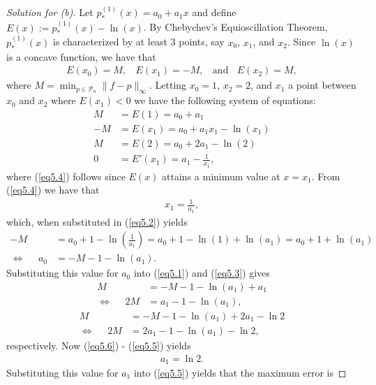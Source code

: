 \documentclass[8pt]{article}
\theoremstyle{definition}
\begin{document}
\begin{proof}[Solution for (b)]
Let $p_*^{(1)} (x) = a_0 + a_1 x$ and define $E(x) := p_*^{(1)} (x) - \ln(x)$. By Chebychev's Equioscillation Theorem, $p_*^{(1)}(x)$ is characterized by at least 3 points, say $x_0$, $x_1$, and $x_2$. Since $\ln(x)$ is a concave function, we have that 
\begin{align*}
E(x_0) = M, \ \ \ \ E(x_1) = -M, \ \ \ \ \text{and} \ \ \ \ E(x_2) = M,
\end{align*}
where $M = \min_{p \in\mathcal{P}_n} \| f - p \|_{\infty}$. Letting $x_0 = 1$, $x_2 = 2$, and $x_1$ a point between $x_0$ and $x_2$ where $E(x_1) < 0$ we have the following system of equations:
\begin{align}
M &= E(1) = a_0 + a_1 \label{eq5.1} \\
-M &= E(x_1) = a_0 + a_1 x_1 - \ln(x_1) \label{eq5.2} \\
M &= E(2) = a_0 + 2 a_1 - \ln(2) \label{eq5.3} \\
0 &= E'(x_1) = a_1 - \frac{1}{x_1}, \label{eq5.4}
\end{align}
where (\ref{eq5.4}) follows since $E(x)$ attains a minimum value at $x = x_1$. From (\ref{eq5.4}) we have that 
\begin{align*}
x_1 = \frac{1}{a_1},
\end{align*}
which, when substituted in (\ref{eq5.2}) yields
\begin{align*}
-M &= a_0 + 1 - \ln \left( \frac{1}{a_1} \right) = a_0 + 1 - \ln(1) + \ln(a_1) = a_0 + 1 + \ln(a_1) \\
\Longleftrightarrow \ \ \ \ \ \ a_0 &= -M - 1 - \ln(a_1).
\end{align*}
Substituting this value for $a_0$ into (\ref{eq5.1}) and (\ref{eq5.3}) gives 
\begin{align}
M &= -M - 1 - \ln(a_1) + a_1 \nonumber \\
\Longleftrightarrow \ \ \ \ \ \ 2 M &= a_1 - 1 - \ln(a_1), \label{eq5.5}
\end{align}
\begin{align}
M &= -M - 1 - \ln(a_1) + 2 a_1 - \ln 2 \nonumber \\
\Longleftrightarrow \ \ \ \ \ \ 2 M &= 2 a_1 - 1 - \ln(a_1) - \ln 2, \label{eq5.6}
\end{align}
respectively. Now (\ref{eq5.6}) - (\ref{eq5.5}) yields
\begin{align*}
a_1 = \ln 2.
\end{align*}
Substituting this value for $a_1$ into (\ref{eq5.5}) yields that the maximum error is 

\end{proof}
\end{document}
